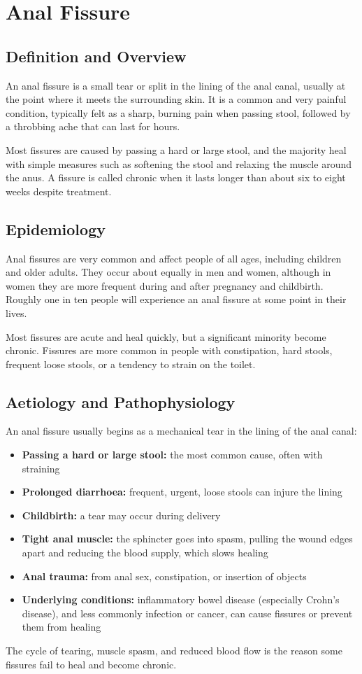 \chapter{Anal Fissure}

\section*{Definition and Overview}
An anal fissure is a small tear or split in the lining of the anal canal, usually at the point where it meets the surrounding skin. It is a common and very painful condition, typically felt as a sharp, burning pain when passing stool, followed by a throbbing ache that can last for hours.

Most fissures are caused by passing a hard or large stool, and the majority heal with simple measures such as softening the stool and relaxing the muscle around the anus. A fissure is called chronic when it lasts longer than about six to eight weeks despite treatment.

\section*{Epidemiology}
Anal fissures are very common and affect people of all ages, including children and older adults. They occur about equally in men and women, although in women they are more frequent during and after pregnancy and childbirth. Roughly one in ten people will experience an anal fissure at some point in their lives.

Most fissures are acute and heal quickly, but a significant minority become chronic. Fissures are more common in people with constipation, hard stools, frequent loose stools, or a tendency to strain on the toilet.

\section*{Aetiology and Pathophysiology}
An anal fissure usually begins as a mechanical tear in the lining of the anal canal:
\begin{itemize}
    \item \textbf{Passing a hard or large stool:} the most common cause, often with straining
    \item \textbf{Prolonged diarrhoea:} frequent, urgent, loose stools can injure the lining
    \item \textbf{Childbirth:} a tear may occur during delivery
    \item \textbf{Tight anal muscle:} the sphincter goes into spasm, pulling the wound edges apart and reducing the blood supply, which slows healing
    \item \textbf{Anal trauma:} from anal sex, constipation, or insertion of objects
    \item \textbf{Underlying conditions:} inflammatory bowel disease (especially Crohn's disease), and less commonly infection or cancer, can cause fissures or prevent them from healing
\end{itemize}
The cycle of tearing, muscle spasm, and reduced blood flow is the reason some fissures fail to heal and become chronic.

